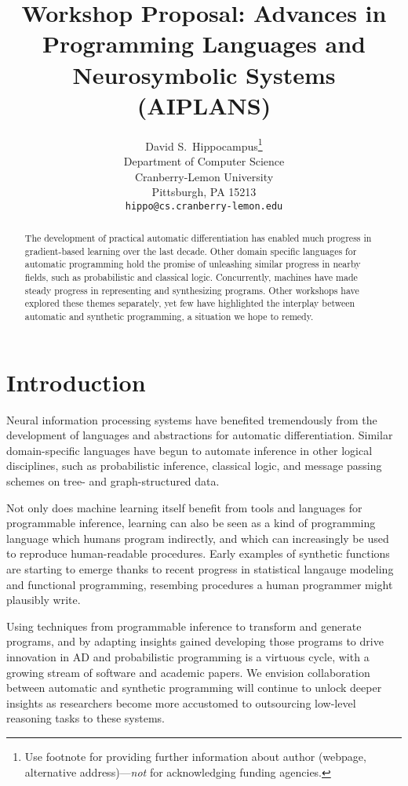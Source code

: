 \documentclass{article}
\title{Workshop Proposal: Advances in Programming Languages and Neurosymbolic Systems (AIPLANS)}
\author{%
    David S.~Hippocampus\thanks{Use footnote for providing further information
    about author (webpage, alternative address)---\emph{not} for acknowledging
    funding agencies.} \\
    Department of Computer Science\\
    Cranberry-Lemon University\\
    Pittsburgh, PA 15213 \\
    \texttt{hippo@cs.cranberry-lemon.edu} \\
}
\begin{document}
    \maketitle

    \begin{abstract}
        The development of practical automatic differentiation has enabled much progress in gradient-based learning over the last decade. Other domain specific languages for automatic programming hold the promise of unleashing similar progress in nearby fields, such as probabilistic and classical logic. Concurrently, machines have made steady progress in representing and synthesizing programs. Other workshops have explored these themes separately, yet few have highlighted the interplay between automatic and synthetic programming, a situation we hope to remedy.
    \end{abstract}

    \section{Introduction}

    Neural information processing systems have benefited tremendously from the development of languages and abstractions for automatic differentiation. Similar domain-specific languages have begun to automate inference in other logical disciplines, such as probabilistic inference, classical logic, and message passing schemes on tree- and graph-structured data.

    Not only does machine learning itself benefit from tools and languages for programmable inference, learning can also be seen as a kind of programming language which humans program indirectly, and which can increasingly be used to reproduce human-readable procedures. Early examples of synthetic functions are starting to emerge thanks to recent progress in statistical langauge modeling and functional programming, resembing procedures a human programmer might plausibly write.

    Using techniques from programmable inference to transform and generate programs, and by adapting insights gained developing those programs to drive innovation in AD and probabilistic programming is a virtuous cycle, with a growing stream of software and academic papers. We envision collaboration between automatic and synthetic programming will continue to unlock deeper insights as researchers become more accustomed to outsourcing low-level reasoning tasks to these systems.
\end{document}
